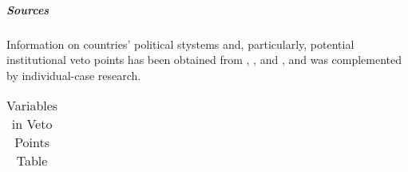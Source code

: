 \subparagraph{Sources}
Information on countries' political stystems and, particularly, potential institutional veto points has been obtained from \citet*{Ismayr2003}, \citet*{Ismayr2004}, and \citet*{Immergut_et_al2006}, and was complemented by individual-case research.


\begin{center}
\begin{longtable}{L{4cm} L{6cm} L{3cm}}
\caption{Variables in Veto Points Table\label{tab_veto_points}}


\end{longtable}
\end{center}

